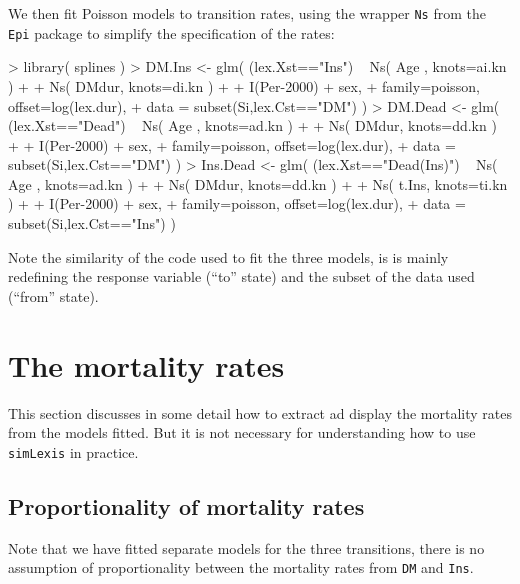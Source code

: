 \documentclass[a4paper,twoside,12pt]{report}
\begin{document}
We then fit Poisson models to transition rates, using the wrapper
\texttt{Ns} from the \texttt{Epi} package to simplify the
specification of the rates:
\begin{Schunk}
\begin{Sinput}
> library( splines )
> DM.Ins <- glm( (lex.Xst=="Ins") ~ Ns( Age  , knots=ai.kn ) +
+                                   Ns( DMdur, knots=di.kn ) +
+                                   I(Per-2000) + sex,
+                family=poisson, offset=log(lex.dur),
+                data = subset(Si,lex.Cst=="DM") )
> DM.Dead <- glm( (lex.Xst=="Dead") ~ Ns( Age  , knots=ad.kn ) +
+                                     Ns( DMdur, knots=dd.kn ) +
+                                     I(Per-2000) + sex,
+                family=poisson, offset=log(lex.dur),
+                data = subset(Si,lex.Cst=="DM") )
> Ins.Dead <- glm( (lex.Xst=="Dead(Ins)") ~ Ns( Age  , knots=ad.kn ) +
+                                           Ns( DMdur, knots=dd.kn ) +
+                                           Ns( t.Ins, knots=ti.kn ) +
+                                           I(Per-2000) + sex,
+                family=poisson, offset=log(lex.dur),
+                data = subset(Si,lex.Cst=="Ins") )
\end{Sinput}
\end{Schunk}
Note the similarity of the code used to fit the three models, is is
mainly redefining the response variable (``to'' state) and the subset
of the data used (``from'' state).

\section{The mortality rates}

This section discusses in some detail how to extract ad display the
mortality rates from the models fitted. But it is not necessary for
understanding how to use \texttt{simLexis} in practice.

\subsection{Proportionality of mortality rates}

Note that we have fitted separate models for the three transitions,
there is no assumption of proportionality between the mortality rates
from \texttt{DM} and \texttt{Ins}.
\end{document}
